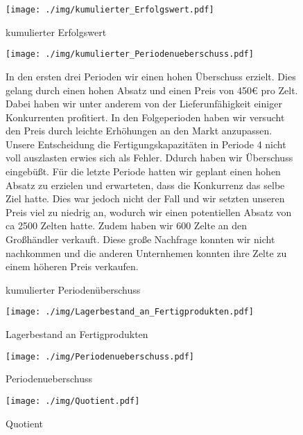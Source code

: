 \documentclass[a4paper, 12pt]{report}
\begin{document}
\begin{flushleft}
 \begin{figure}[b]
 \centering 
 \texttt{[image: ./img/kumulierter\_Erfolgswert.pdf]}
  \caption[kumulierter Erfolgswert]{kumulierter Erfolgswert}
\end{figure}
 
 \begin{figure}
 \centering 
 \texttt{[image: ./img/kumulierter\_Periodenueberschuss.pdf]}
  \caption[kumulierter Periodenüberschuss]
  {kumulierter Periodenüberschuss}
  \begin{flushleft}
 In den ersten drei Perioden wir einen hohen Überschuss erzielt.
Dies gelang durch einen hohen Absatz und einen Preis von 450€ pro Zelt. 
Dabei haben wir unter anderem von der Lieferunfähigkeit einiger Konkurrenten profitiert.
In den Folgeperioden haben wir versucht den Preis durch leichte Erhöhungen an den Markt anzupassen. Unsere Entscheidung die Fertigungskapazitäten in Periode 4 nicht voll auszlasten erwies sich als Fehler. Ddurch haben wir Überschuss eingebüßt. 
Für die letzte Periode hatten wir geplant einen hohen Absatz zu erzielen und erwarteten, dass die Konkurrenz das selbe Ziel hatte. Dies war jedoch nicht der Fall und wir setzten unseren Preis viel zu niedrig an, wodurch wir einen potentiellen Absatz von ca 2500 Zelten hatte. Zudem haben wir 600 Zelte an den Großhändler verkauft. Diese große Nachfrage konnten wir nicht nachkommen und die anderen Unternhemen konnten ihre Zelte zu einem höheren Preis verkaufen.
  \end{flushleft}
\end{figure}

 \begin{figure}
 \centering 
 \texttt{[image: ./img/Lagerbestand\_an\_Fertigprodukten.pdf]}
  \caption[Lagerbestand an Fertigprodukten]{Lagerbestand an Fertigprodukten}
\end{figure}

\begin{figure}
 \centering 
 \texttt{[image: ./img/Periodenueberschuss.pdf]}
  \caption[Periodenueberschuss]{Periodenueberschuss}
\end{figure}
 
 \begin{figure}[b]
 \centering 
 \texttt{[image: ./img/Quotient.pdf]}
  \caption[Quotient]{Quotient}
\end{figure}




\end{flushleft}
\end{document}
